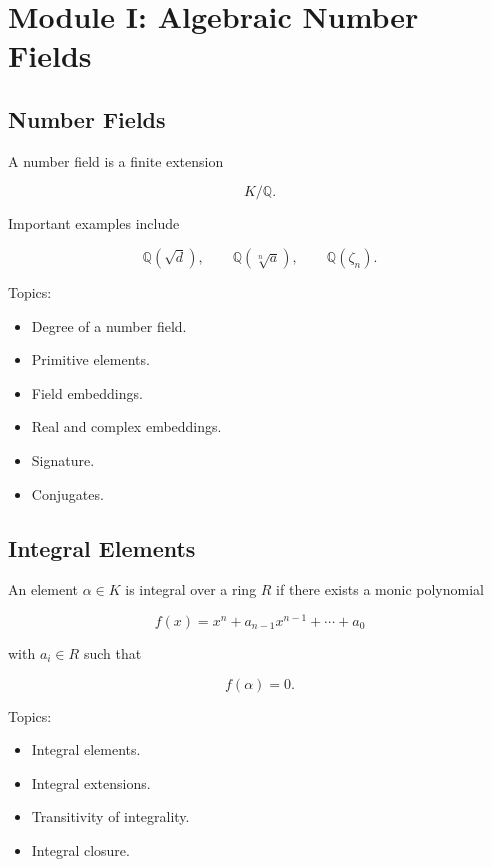 \documentclass[11pt]{article}
\begin{document}
\section{Module I: Algebraic Number Fields}

\subsection{Number Fields}

A number field is a finite extension

\[
K/\mathbb{Q}.
\]

Important examples include

\[
\mathbb{Q}(\sqrt{d}),
\qquad
\mathbb{Q}(\sqrt[n]{a}),
\qquad
\mathbb{Q}(\zeta_n).
\]

Topics:

\begin{itemize}
    \item Degree of a number field.
    \item Primitive elements.
    \item Field embeddings.
    \item Real and complex embeddings.
    \item Signature.
    \item Conjugates.
\end{itemize}

\subsection{Integral Elements}

An element $\alpha\in K$ is integral over a ring $R$ if
there exists a monic polynomial

\[
f(x)=x^n+a_{n-1}x^{n-1}+\cdots+a_0
\]

with $a_i\in R$ such that

\[
f(\alpha)=0.
\]

Topics:

\begin{itemize}
    \item Integral elements.
    \item Integral extensions.
    \item Transitivity of integrality.
    \item Integral closure.
\end{itemize}
\end{document}
